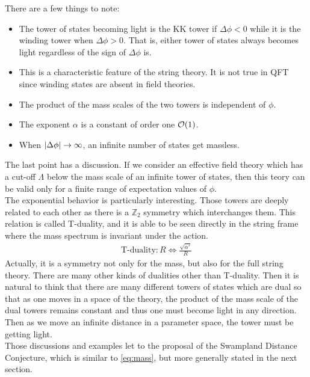 There are a few things to note:
\begin{itemize}
    \item {The tower of states becoming light is the KK tower if $\Delta \phi <0$ while it is the winding tower when $\Delta \phi >0$. That is, either tower of states always becomes light regardless of the sign of $\Delta\phi$ is.}
    \item {This is a characteristic feature of the string theory. It is not true in QFT since winding states are absent in field theories.}
    \item {The product of the mass scales of the two towers is independent of $\phi$.}
    \item {The exponent $\alpha$ is a constant of order one $\order{1}$.}
    \item {When $\abs{\Delta \phi} \rightarrow  \infty$, an infinite number of states get massless.} 
\end{itemize}
The last point has a discussion. If we consider an effective field theory which has a cut-off $\Lambda$ below the mass scale of an infinite tower of states, then this teory can be valid only for a finite range of expectation values of $\phi$. \\
\indent The exponential behavior is particularly interesting. Those towers are deeply related to each other as there is a $\mathbb{Z}_{2}$ symmetry which interchanges them. This relation is called T-duality, and it is able to be seen directly in the string frame where the mass spectrum is invariant under the action. 
\begin{align}
    \text{T-duality} : R \Leftrightarrow \frac{\sqrt{\alpha'}}{R}
\end{align}
Actually, it is a symmetry not only for the mass, but also for the full string theory. There are many other kinds of dualities other than T-duality. Then it is natural to think that there are many different towers of states which are dual so that as one moves in a space of the theory, the product of the mass scale of the dual towers remains constant and thus one must become light in any direction. Then as we move an infinite distance in a parameter space, the tower must be getting light. \\
\indent Those discussions and examples let to the proposal of the Swampland Distance Conjecture, which is similar to \ref{eq:mass}, but more generally stated in the next section.



